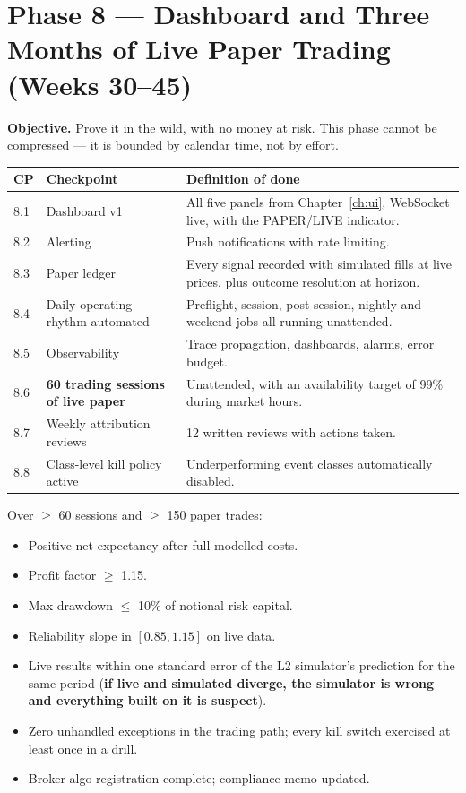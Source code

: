 \section{Phase 8 --- Dashboard and Three Months of Live Paper Trading (Weeks 30--45)}

\textbf{Objective.} Prove it in the wild, with no money at risk. This phase
cannot be compressed --- it is bounded by calendar time, not by effort.

\begin{longtable}{@{}p{1.4cm}p{6.0cm}p{7.0cm}@{}}
\toprule
\textbf{CP} & \textbf{Checkpoint} & \textbf{Definition of done}\\
\midrule
8.1 & Dashboard v1 & All five panels from Chapter~\ref{ch:ui}, WebSocket live,
with the PAPER/LIVE indicator.\\
8.2 & Alerting & Push notifications with rate limiting.\\
8.3 & Paper ledger & Every signal recorded with simulated fills at live prices,
plus outcome resolution at horizon.\\
8.4 & Daily operating rhythm automated & Preflight, session, post-session,
nightly and weekend jobs all running unattended.\\
8.5 & Observability & Trace propagation, dashboards, alarms, error budget.\\
8.6 & \textbf{60 trading sessions of live paper} & Unattended, with an
availability target of 99\% during market hours.\\
8.7 & Weekly attribution reviews & 12 written reviews with actions taken.\\
8.8 & Class-level kill policy active & Underperforming event classes
automatically disabled.\\
\bottomrule
\end{longtable}

\begin{gatebox}[title={Gate G8 --- the go-live gate}]
Over $\ge$ 60 sessions and $\ge$ 150 paper trades:
\begin{itemize}
\item Positive net expectancy after full modelled costs.
\item Profit factor $\ge$ 1.15.
\item Max drawdown $\le$ 10\% of notional risk capital.
\item Reliability slope in $[0.85,1.15]$ on live data.
\item Live results within one standard error of the L2 simulator's prediction
for the same period (\textbf{if live and simulated diverge, the simulator is
wrong and everything built on it is suspect}).
\item Zero unhandled exceptions in the trading path; every kill switch exercised
at least once in a drill.
\item Broker algo registration complete; compliance memo updated.
\end{itemize}
\end{gatebox}

